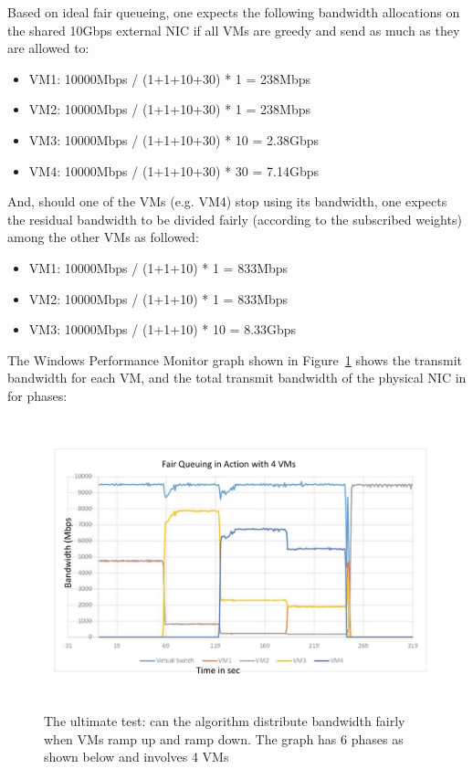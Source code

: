 Based on ideal fair queueing, one expects the following bandwidth allocations on the shared 10Gbps external NIC if all VMs are greedy and send as much as they are allowed to:
\begin{itemize}
\item VM1: 10000Mbps / (1+1+10+30) * 1 = 238Mbps
\item VM2: 10000Mbps / (1+1+10+30) * 1 = 238Mbps
\item VM3: 10000Mbps / (1+1+10+30) * 10 = 2.38Gbps
\item VM4: 10000Mbps / (1+1+10+30) * 30 = 7.14Gbps
\end{itemize}
 
And, should one of the VMs (e.g. VM4) stop using its bandwidth, one expects the residual bandwidth to be divided fairly (according to the subscribed weights) among the other VMs as followed:
\begin{itemize}
\item VM1: 10000Mbps / (1+1+10) * 1 = 833Mbps
\item VM2: 10000Mbps / (1+1+10) * 1 = 833Mbps
\item  VM3: 10000Mbps / (1+1+10) * 10 = 8.33Gbps  
\end{itemize}

The Windows Performance Monitor graph shown in Figure~\ref{fairsharing}  shows the transmit bandwidth for each VM, and the total transmit bandwidth of the physical NIC in for phases:

\begin{figure}[h]
\centering
\includegraphics[width=\columnwidth,trim=60pt 20mm 0pt 8mm]{figures/fairsharing}
\caption{The ultimate test: can the algorithm distribute bandwidth fairly when VMs ramp up and ramp down.  The graph has 6 phases as shown below and involves 4 VMs}
\label{fairsharing}
\vspace{-3mm}
\end{figure}

